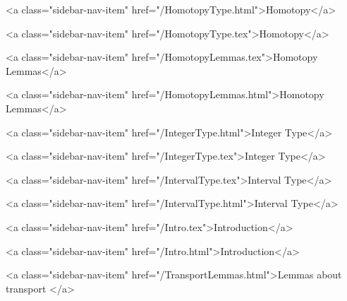       
        
          <a class="sidebar-nav-item" href="/HomotopyType.html">Homotopy</a>
        
      
    
      
        
          <a class="sidebar-nav-item" href="/HomotopyType.tex">Homotopy</a>
        
      
    
      
        
          <a class="sidebar-nav-item" href="/HomotopyLemmas.tex">Homotopy Lemmas</a>
        
      
    
      
        
          <a class="sidebar-nav-item" href="/HomotopyLemmas.html">Homotopy Lemmas</a>
        
      
    
      
        
          <a class="sidebar-nav-item" href="/IntegerType.html">Integer Type</a>
        
      
    
      
        
          <a class="sidebar-nav-item" href="/IntegerType.tex">Integer Type</a>
        
      
    
      
        
          <a class="sidebar-nav-item" href="/IntervalType.tex">Interval Type</a>
        
      
    
      
        
          <a class="sidebar-nav-item" href="/IntervalType.html">Interval Type</a>
        
      
    
      
        
          <a class="sidebar-nav-item" href="/Intro.tex">Introduction</a>
        
      
    
      
        
          <a class="sidebar-nav-item" href="/Intro.html">Introduction</a>
        
      
    
      
        
          <a class="sidebar-nav-item" href="/TransportLemmas.html">Lemmas about transport </a>
        
      
    
